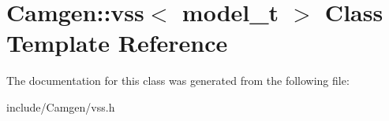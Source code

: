 \hypertarget{a00593}{}\section{Camgen\+:\+:vss$<$ model\+\_\+t $>$ Class Template Reference}
\label{a00593}


The documentation for this class was generated from the following file\+:\begin{DoxyCompactItemize}
\item 
include/\+Camgen/vss.\+h\end{DoxyCompactItemize}

